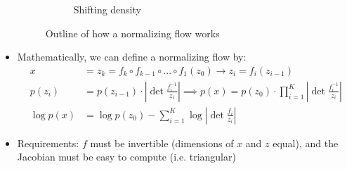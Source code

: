\begin{itemize}
\begin{figure}[ht!]
\begin{subfigure}{0.2\textwidth}
			\caption{Shifting density}
			\label{fig:NF_density_shift}
		\end{subfigure}
		\caption{Outline of how a normalizing flow works}
		\label{fig:NF}
	\end{figure} 
	\item Mathematically, we can define a normalizing flow by:
	\begin{equation*}
		\begin{split}
			x & = z_k = f_k \circ f_{k-1} \circ ... \circ f_1 (z_0) \to z_i = f_i(z_{i-1})\\
			p(z_i) & = p(z_{i-1}) \cdot \left|\det \frac{f_{i}^{-1}}{z_i}\right| \implies p(x) = p(z_0) \cdot \prod_{i=1}^{K} \left|\det \frac{f_{i}^{-1}}{z_i}\right|\\
			\log p(x) & = \log p(z_0) - \sum_{i=1}^{K} \log \left|\det \frac{f_{i}}{z_i}\right|
		\end{split}
	\end{equation*}
	\item Requirements: $f$ must be invertible (dimensions of $x$ and $z$ equal), and the Jacobian must be easy to compute (i.e. triangular)
\end{itemize}